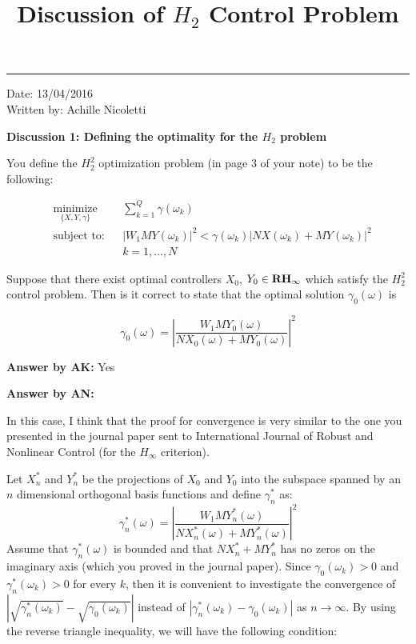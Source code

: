 \documentclass[12pt]{article}
\title{\LARGE \bf Discussion of $H_2$ Control Problem}
\begin{document}
\maketitle

\hrule
\begin{flushright}
Date: 13/04/2016 \\
Written by: Achille Nicoletti
\end{flushright}
\textbf{Discussion 1: Defining the optimality for the $H_2$ problem}

You define the $H_2^2$ optimization problem (in page 3 of your note) to be the following:

\begin{equation} \label{eq:opt_prob_1}
\begin{aligned}
& \underset{ \{X,Y,\gamma\}}{\text{minimize}}
& & \sum_{k=1}^Q \gamma (\omega_k)  \\
& \text{subject to:} & & |W_1MY(\omega_k)|^2 < \gamma(\omega_k) |NX(\omega_k)+MY(\omega_k)|^2  \\ 
& & & k = 1,\ldots,N
\end{aligned}
\end{equation}

Suppose that there exist optimal controllers $X_0$, $Y_0 \in \bf{RH_{\infty}}$ which satisfy the $H_2^2$ control problem. Then is it correct to state that the optimal solution $\gamma_0(\omega)$ is

\begin{equation}
\gamma_0(\omega) =  \left\lvert\frac{W_1MY_0(\omega)}{NX_0(\omega) + MY_0(\omega)} \right\rvert ^2
\end{equation}

{\bf Answer by AK:} Yes

{\bf Answer by AN:} 

In this case, I think that the proof for convergence is very similar to the one you presented in the journal paper sent to International Journal of Robust and Nonlinear Control (for the $H_\infty$ criterion). 

Let $X_n^*$ and $Y_n^*$ be the projections of $X_0$ and $Y_0$ into the subspace spanned by an $n$ dimensional orthogonal basis functions and define $\gamma_n^*$ as:
\begin{equation}
\gamma_n^*(\omega) =  \left\lvert\frac{W_1MY_n^*(\omega)}{NX_n^*(\omega) + MY_n^*(\omega)} \right\rvert ^2
\end{equation}
Assume that $\gamma_n^*(\omega)$ is bounded and that $NX_n^* + MY_n^*$ has no zeros on the imaginary axis (which you proved in the journal paper). Since $\gamma_0(\omega_k) > 0$ and $\gamma_n^*(\omega_k) > 0$ for every $k$, then it is convenient to investigate the convergence of $|\sqrt{\gamma_n^*(\omega_k)} - \sqrt{\gamma_0(\omega_k)}|$ instead of $|\gamma_n^*(\omega_k) - \gamma_0(\omega_k)|$ as $n \rightarrow \infty$. By using the reverse triangle inequality, we will have the following condition:
\end{document}

